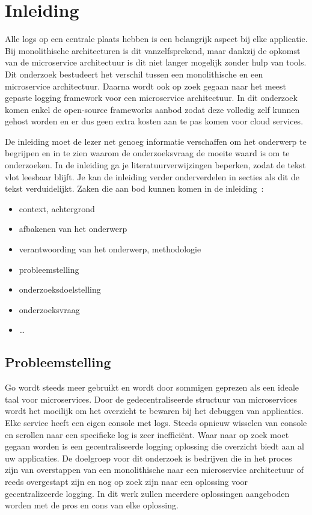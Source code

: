 
\chapter{Inleiding}
\label{ch:inleiding}

Alle logs op een centrale plaats hebben is een belangrijk aspect bij elke applicatie. Bij monolithische architecturen is dit vanzelfsprekend, maar dankzij de opkomst van de microservice architectuur is dit niet langer mogelijk zonder hulp van tools. Dit onderzoek bestudeert het verschil tussen een monolithische en een microservice architectuur. Daarna wordt ook op zoek gegaan naar het meest gepaste logging framework voor een microservice architectuur. In dit onderzoek komen enkel de open-source frameworks aanbod zodat deze volledig zelf kunnen gehost worden en er dus geen extra kosten aan te pas komen voor cloud services. 

De inleiding moet de lezer net genoeg informatie verschaffen om het onderwerp te begrijpen en in te zien waarom de onderzoeksvraag de moeite waard is om te onderzoeken. In de inleiding ga je literatuurverwijzingen beperken, zodat de tekst vlot leesbaar blijft. Je kan de inleiding verder onderverdelen in secties als dit de tekst verduidelijkt. Zaken die aan bod kunnen komen in de inleiding~\autocite{Pollefliet2011}:

\begin{itemize}
  \item context, achtergrond
  \item afbakenen van het onderwerp
  \item verantwoording van het onderwerp, methodologie
  \item probleemstelling
  \item onderzoeksdoelstelling
  \item onderzoeksvraag
  \item \ldots
\end{itemize}

\section{Probleemstelling}
\label{sec:probleemstelling}

Go wordt steeds meer gebruikt en wordt door sommigen geprezen als een ideale taal voor microservices. Door de gedecentraliseerde structuur van microservices wordt het moeilijk om het overzicht te bewaren bij het debuggen van applicaties. Elke service heeft een eigen console met logs. Steeds opnieuw wisselen van console en scrollen naar een specifieke log is zeer inefficiënt. Waar naar op zoek moet gegaan worden is een gecentraliseerde logging oplossing die overzicht biedt aan al uw applicaties. De doelgroep voor dit onderzoek is bedrijven die in het proces zijn van overstappen van een monolithische naar een microservice architectuur of reeds overgestapt zijn en nog op zoek zijn naar een oplossing voor gecentralizeerde logging. In dit werk zullen meerdere oplossingen aangeboden worden met de pros en cons van elke oplossing.

